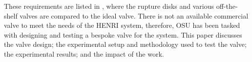 These requirements are listed in , where the rupture disks and various off-the-shelf valves are compared to the ideal valve. There is not an available commercial valve to meet the needs of the HENRI system, therefore, OSU has been tasked with designing and testing a bespoke valve for the system. This paper discusses  the valve design; the experimental setup and methodology used to test the valve; the experimental results; and the impact of the work.

